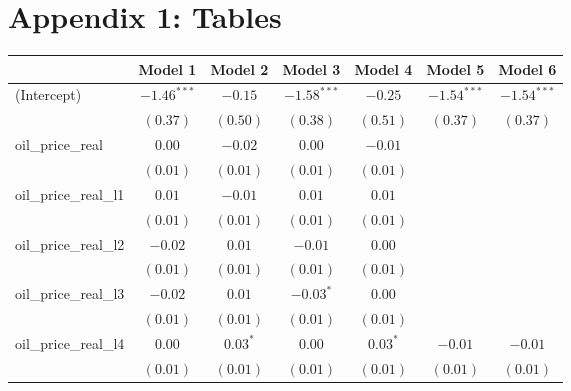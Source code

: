 \documentclass[12pt]{article}
\begin{document}
\section{Appendix 1: Tables}
\begin{table}
\begin{center}
\begin{tabular}{l c c c c c c }
\hline
                                     & Model 1 & Model 2 & Model 3 & Model 4 & Model 5 & Model 6 \\
\hline
(Intercept)                          & $-1.46^{***}$ & $-0.15$       & $-1.58^{***}$ & $-0.25$       & $-1.54^{***}$ & $-1.54^{***}$ \\
                                     & $(0.37)$      & $(0.50)$      & $(0.38)$      & $(0.51)$      & $(0.37)$      & $(0.37)$      \\
oil_price_real                       & $0.00$        & $-0.02$       & $0.00$        & $-0.01$       &               &               \\
                                     & $(0.01)$      & $(0.01)$      & $(0.01)$      & $(0.01)$      &               &               \\
oil_price_real_l1                    & $0.01$        & $-0.01$       & $0.01$        & $0.01$        &               &               \\
                                     & $(0.01)$      & $(0.01)$      & $(0.01)$      & $(0.01)$      &               &               \\
oil_price_real_l2                    & $-0.02$       & $0.01$        & $-0.01$       & $0.00$        &               &               \\
                                     & $(0.01)$      & $(0.01)$      & $(0.01)$      & $(0.01)$      &               &               \\
oil_price_real_l3                    & $-0.02$       & $0.01$        & $-0.03^{*}$   & $0.00$        &               &               \\
                                     & $(0.01)$      & $(0.01)$      & $(0.01)$      & $(0.01)$      &               &               \\
oil_price_real_l4                    & $0.00$        & $0.03^{*}$    & $0.00$        & $0.03^{*}$    & $-0.01$       & $-0.01$       \\
                                     & $(0.01)$      & $(0.01)$      & $(0.01)$      & $(0.01)$      & $(0.01)$      & $(0.01)$      \\

\end{tabular}
\end{center}
\end{table}
\end{document}
